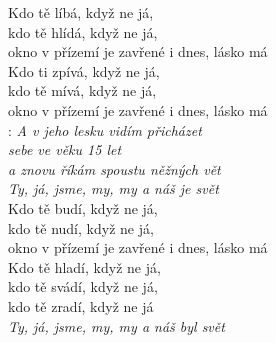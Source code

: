 
Kdo tě líbá, když ne já,\\
kdo tě hlídá, když ne já,\\
okno v přízemí je zavřené i dnes,
lásko má\\

Kdo ti zpívá, když ne já,\\
kdo tě mívá, když ne já,\\
okno v přízemí je zavřené i dnes, lásko má\\

\textregistered:
\emph{A v jeho lesku vidím přicházet\\
sebe ve věku 15 let\\
a znovu říkám spoustu něžných vět\\
Ty, já, jsme, my, my a náš je svět}\\

Kdo tě budí, když ne já,\\
kdo tě nudí, když ne já,\\
okno v přízemí je zavřené i dnes, lásko má \hspace{1cm} \textregistered\\

Kdo tě hladí, když ne já,\\
kdo tě svádí, když ne já,\\
kdo tě zradí, když ne já\\

\emph{Ty, já, jsme, my, my a náš byl svět}

\newpage
